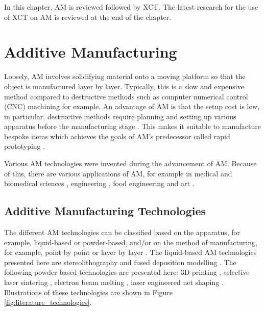 In this chapter, AM is reviewed followed by XCT. The latest research for the use of XCT on AM is reviewed at the end of the chapter.

\section{Additive Manufacturing}

Loosely, AM involves solidifying material onto a moving platform so that the object is manufactured layer by layer. Typically, this is a slow and expensive method compared to destructive methods such as computer numerical control (CNC) machining for example. An advantage of AM is that the setup cost is low, in particular, destructive methods require planning and setting up various apparatus before the manufacturing stage \citep{gibson2010additive}. This makes it suitable to manufacture bespoke items which achieves the goals of AM's predecessor called rapid prototyping \citep{kruth1991material}.

Various AM technologies were invented during the advancement of AM. Because of this, there are various applications of AM, for example in medical and biomedical sciences \citep{kang20163d, kourra2018computed}, engineering \citep{cooper2015design}, food engineering \citep{godoi20163d} and art \citep{ornes2013mathematics, grossman2019bathsheba}.

\subsection{Additive Manufacturing Technologies}

The different AM technologies can be classified based on the apparatus, for example, liquid-based or powder-based, and/or on the method of manufacturing, for example, point by point or layer by layer \citep{kruth1991material}. The liquid-based AM technologies presented here are stereolithography \citep{kodama1981automatic, hull1986apparatus, 3d2019our} and fused deposition modelling \citep{crump1991fused, crump1992apparatus, stratasys2019what}. The following powder-based technologies are presented here: 3D printing \citep{sachs1990three}, selective laser sintering \citep{deckard1989method, dtm1990the, 3d2019our}, electron beam melting \citep{larsson2004arrangement, arcam2019history}, laser engineered net shaping \citep{atwood1998laser}. Illustrations of these technologies are shown in Figure \ref{fig:literature_technologies}.

